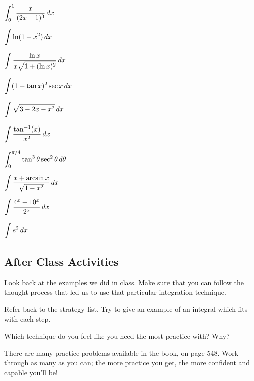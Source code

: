 \documentclass[notes]{subfiles}
\begin{document}
		\begin{ex}
			$\displaystyle \int_0^1 \dfrac{x}{(2x+1)^3}\, dx$
		\end{ex}
			\newpage
			
		\begin{ex}
			$\displaystyle \int \ln(1+x^2)\, dx$
		\end{ex}
			
		\begin{ex}
			$\displaystyle \int \dfrac{\ln x}{x\sqrt{1+(\ln x)^2}}\, dx$
		\end{ex}
			\newpage
			
		\begin{ex}
			$\displaystyle \int (1+\tan x)^2\sec x\, dx$
		\end{ex}
			
		\begin{ex}
			$\displaystyle \int \sqrt{3-2x-x^2}\, dx$
		\end{ex}	
			\newpage
		
		\begin{ex}
			$\displaystyle \int \dfrac{\tan^{-1}(x)}{x^2}\, dx$
		\end{ex}	
			
		\begin{ex}
			$\displaystyle \int_0^{\pi/4} \tan^3\theta\sec^2\theta\, d\theta$
		\end{ex}
			\newpage
			
		\begin{ex}
			$\displaystyle \int \dfrac{x + \arcsin x}{\sqrt{1-x^2}}\, dx$
		\end{ex}
			
		\begin{ex}
			$\displaystyle \int \dfrac{4^x + 10^x}{2^x}\, dx$
		\end{ex}
			
		\begin{ex}
			$\displaystyle \int e^2\, dx$
		\end{ex}
			\newpage
			
	\subsection*{After Class Activities}
		\begin{ex}
			Look back at the examples we did in class.  Make sure that you can follow the thought process that led us to use that particular integration technique.
		\end{ex}
		\begin{ex}
			Refer back to the strategy list.  Try to give an example of an integral which fits with each step.
		\end{ex}
			
		\begin{ex}
			Which technique do you feel like you need the most practice with?  Why?
		\end{ex}
			
		\begin{ex}
			There are many practice problems available in the book, on page 548.  Work through as many as you can; the more practice you get, the more confident and capable you'll be!
		\end{ex}
\clearpage
\end{document}
